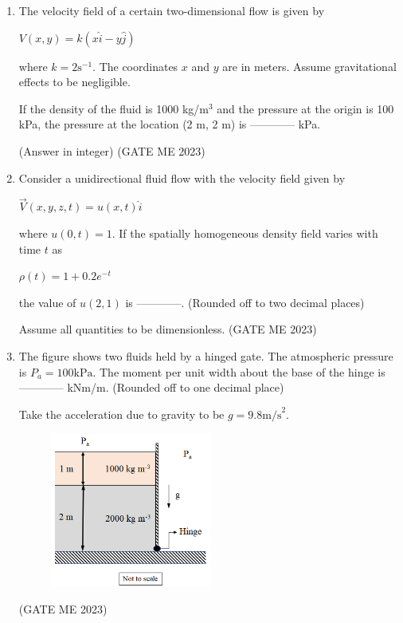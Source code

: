\documentclass[journal]{IEEEtran}
\begin{document}
\begin{enumerate}
\item The velocity field of a certain two-dimensional flow is given by

$ V(x,y) = k(x \hat{i} - y \hat{j}) $

where $ k = 2  \text{s}^{-1} $. The coordinates $ x $ and $ y $ are in meters. Assume gravitational effects to be negligible. 

If the density of the fluid is 1000 kg/m$^3$ and the pressure at the origin is 100 kPa, the pressure at the location (2 m, 2 m) is ------------ kPa. 

(Answer in integer)
\hfill (GATE ME 2023)

\item Consider a unidirectional fluid flow with the velocity field given by 
\begin{center}
$ \Vec{V}(x,y,z,t) = u(x,t)  \hat{i} $
\end{center}
where $ u(0,t) = 1 $. If the spatially homogeneous density field varies with time $ t $ as 
\begin{center}
$ \rho(t) = 1 + 0.2e^{-t} $
\end{center}
the value of $ u(2,1) $ is ------------. (Rounded off to two decimal places) 

Assume all quantities to be dimensionless.
\hfill (GATE ME 2023)

\item The figure shows two fluids held by a hinged gate. The atmospheric pressure is $ P_a = 100  \text{kPa} $. The moment per unit width about the base of the hinge is ------------ kNm/m. (Rounded off to one decimal place) 

Take the acceleration due to gravity to be $ g = 9.8  \text{m/s}^2 $.

\begin{figure}[H]
\centering
\includegraphics[width=0.5\textwidth]{Fig 53.png}
\caption{}
\label{fig:question64}
\end{figure}
\hfill (GATE ME 2023)


\end{enumerate}
\end{document}
